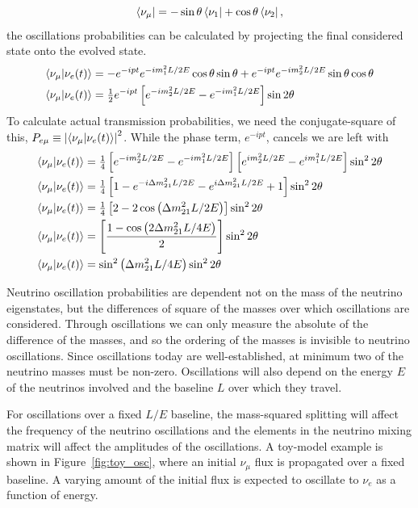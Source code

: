 \documentclass[main.tex]{subfiles}
\begin{document}
\begin{equation}
    \left< \nu_{\mu} \right | = -\sin\theta\left< \nu_{1} \right | + \cos\theta\left< \nu_{2} \right |,
\end{equation}
the oscillations probabilities can be calculated by projecting the final considered state onto the evolved state.
\begin{align}
    \left< \nu_{\mu} | \nu_{e}(t) \right> &= -e^{-ipt}e^{ -im_{1}^{2}L/2E} \cos\theta\sin\theta  + e^{-ipt}e^{ -im_{2}^{2}L/2E} \sin\theta\cos\theta \\
    \left< \nu_{\mu} | \nu_{e}(t) \right> &= \tfrac{1}{2}e^{-ipt}\left[e^{ -im_{2}^{2}L/2E} - e^{ -im_{1}^{2}L/2E}\right] \sin 2\theta
\end{align}
To calculate actual transmission probabilities, we need the conjugate-square of this, $P_{e\mu} \equiv \left|\left< \nu_{\mu}|\nu_{e}(t) \right>\right|^{2}$. While the phase term, $e^{-ipt}$, cancels we are left with 
\begin{align}
    \left< \nu_{\mu} | \nu_{e}(t) \right> &=\tfrac{1}{4} \left[e^{ -im_{2}^{2}L/2E} - e^{ -im_{1}^{2}L/2E}\right]\left[e^{ im_{2}^{2}L/2E} - e^{ im_{1}^{2}L/2E}\right] \sin^{2} 2\theta \\
    \left< \nu_{\mu} | \nu_{e}(t) \right> &=\tfrac{1}{4}\left[1 - e^{-i\Delta m_{21}^{2}L/2E}- e^{i\Delta m_{21}^{2}L/2E}  +1\right]\sin^{2} 2\theta\\
    \left< \nu_{\mu} | \nu_{e}(t) \right> &=\tfrac{1}{4}\left[2- 2\cos\left( \Delta m_{21}^{2}L/2E\right) \right]\sin^{2} 2\theta \\
    \left< \nu_{\mu} | \nu_{e}(t) \right> &=\left[\dfrac{1-\cos\left( 2\Delta m_{21}^{2}L/4E\right)}{2} \right]\sin^{2} 2\theta \\
    \left< \nu_{\mu} | \nu_{e}(t) \right> &=\sin^{2}\left( \Delta m_{21}^{2}L/4E\right) \sin^{2} 2\theta
\end{align}

Neutrino oscillation probabilities are dependent not on the mass of the neutrino eigenstates, but the differences of square of the masses over which oscillations are considered.
Through oscillations we can only measure the absolute of the difference of the masses, and so the ordering of the masses is invisible to neutrino oscillations. 
Since oscillations today are well-established, at minimum two of the neutrino masses must be non-zero. 
Oscillations will also depend on the energy $E$ of the neutrinos involved and the baseline $L$ over which they travel. 

For oscillations over a fixed $L/E$ baseline, the mass-squared splitting will affect the frequency of the neutrino oscillations and the elements in the neutrino mixing matrix will affect the amplitudes of the oscillations. 
A toy-model example is shown in Figure~\ref{fig:toy_osc}, where an initial $\nu_{\mu}$ flux is propagated over a fixed baseline. 
A varying amount of the initial flux is expected to oscillate to $\nu_{e}$ as a function of energy. 
\end{document}
